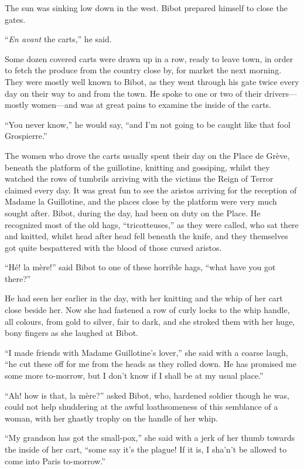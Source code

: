 The sun was sinking low down in the west. Bibot prepared himself to close the gates.

\enquote{\textit{En avant} the carts,} he said.

Some dozen covered carts were drawn up in a row, ready to leave town, in order to fetch the produce from the country close by, for market the next morning. They were mostly well known to Bibot, as they went through his gate twice every day on their way to and from the town. He spoke to one or two of their drivers---mostly women---and was at great pains to examine the inside of the carts.

\enquote{You never know,} he would say, \enquote{and I'm not going to be caught like that fool Grospierre.}

The women who drove the carts usually spent their day on the Place de Grève, beneath the platform of the guillotine, knitting and gossiping, whilst they watched the rows of tumbrils arriving with the victims the Reign of Terror claimed every day. It was great fun to see the aristos arriving for the reception of Madame la Guillotine, and the places close by the platform were very much sought after. Bibot, during the day, had been on duty on the Place. He recognized most of the old hags, \enquote{tricotteuses,} as they were called, who sat there and knitted, whilst head after head fell beneath the knife, and they themselves got quite bespattered with the blood of those cursed aristos.

\enquote{Hé! la mère!} said Bibot to one of these horrible hags, \enquote{what have you got there?}

He had seen her earlier in the day, with her knitting and the whip of her cart close beside her. Now she had fastened a row of curly locks to the whip handle, all colours, from gold to silver, fair to dark, and she stroked them with her huge, bony fingers as she laughed at Bibot.

\enquote{I made friends with Madame Guillotine's lover,} she said with a coarse laugh, \enquote{he cut these off for me from the heads as they rolled down. He has promised me some more to-morrow, but I don't know if I shall be at my usual place.}

\enquote{Ah! how is that, la mère?} asked Bibot, who, hardened soldier though he was, could not help shuddering at the awful loathsomeness of this semblance of a woman, with her ghastly trophy on the handle of her whip.

\enquote{My grandson has got the small-pox,} she said with a jerk of her thumb towards the inside of her cart, \enquote{some say it's the plague! If it is, I sha'n’t be allowed to come into Paris to-morrow.}

